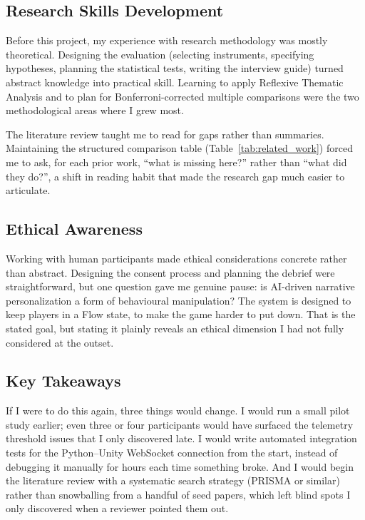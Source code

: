\subsection{Research Skills Development}

Before this project, my experience with research methodology was mostly theoretical. Designing the evaluation (selecting instruments, specifying hypotheses, planning the statistical tests, writing the interview guide) turned abstract knowledge into practical skill. Learning to apply Reflexive Thematic Analysis \citep{braun2022thematic} and to plan for Bonferroni-corrected multiple comparisons were the two methodological areas where I grew most.

The literature review taught me to read for gaps rather than summaries. Maintaining the structured comparison table (Table~\ref{tab:related_work}) forced me to ask, for each prior work, ``what is missing here?'' rather than ``what did they do?'', a shift in reading habit that made the research gap much easier to articulate.

\subsection{Ethical Awareness}

Working with human participants made ethical considerations concrete rather than abstract. Designing the consent process and planning the debrief were straightforward, but one question gave me genuine pause: is AI-driven narrative personalization a form of behavioural manipulation? The system is designed to keep players in a Flow state, to make the game harder to put down. That is the stated goal, but stating it plainly reveals an ethical dimension I had not fully considered at the outset.

\subsection{Key Takeaways}

If I were to do this again, three things would change. I would run a small pilot study earlier; even three or four participants would have surfaced the telemetry threshold issues that I only discovered late. I would write automated integration tests for the Python--Unity WebSocket connection from the start, instead of debugging it manually for hours each time something broke. And I would begin the literature review with a systematic search strategy (PRISMA or similar) rather than snowballing from a handful of seed papers, which left blind spots I only discovered when a reviewer pointed them out.


